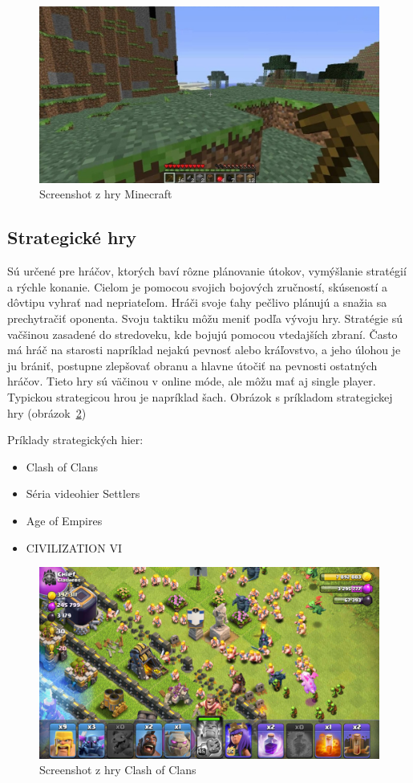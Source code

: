 \documentclass[10pt,oneside,slovak,a4paper]{article}
\begin{document}
\begin{figure}[tbh]
\centering
\includegraphics[scale=0.2]{minecraft.jpg}
\caption{Screenshot z hry Minecraft}
\label{f:minecraft}
\end{figure}

\subsection{Strategické hry} \label{zanre:strategicke}

Sú určené pre hráčov, ktorých baví rôzne plánovanie útokov, vymýšlanie stratégií a rýchle konanie. Cielom je pomocou svojich bojových zručností, skúseností a dôvtipu vyhrať nad nepriateľom. Hráči svoje ťahy pečlivo plánujú a snažia sa prechytračiť oponenta. Svoju taktiku môžu meniť podľa vývoju hry. Stratégie sú vačšinou zasadené do stredoveku, kde bojujú pomocou vtedajších zbraní. Často má hráč na starosti napríklad nejakú pevnosť alebo kráľovstvo, a jeho úlohou je ju brániť, postupne zlepšovať obranu a hlavne útočiť na pevnosti ostatných hráčov. Tieto hry sú väčinou v online móde, ale môžu mať aj single player.  Typickou strategicou hrou je napríklad šach. Obrázok s príkladom strategickej hry (obrázok~\ref{f:coc})

Príklady strategických hier:
\begin{itemize}
\item Clash of Clans
\item Séria videohier Settlers
\item Age of Empires
\item CIVILIZATION VI
\end{itemize}

\begin{figure}[tbh]
\centering
\includegraphics[scale=0.20]{coc.jpg}
\caption{Screenshot z hry Clash of Clans}
\label{f:coc}
\end{figure}
\end{document}
